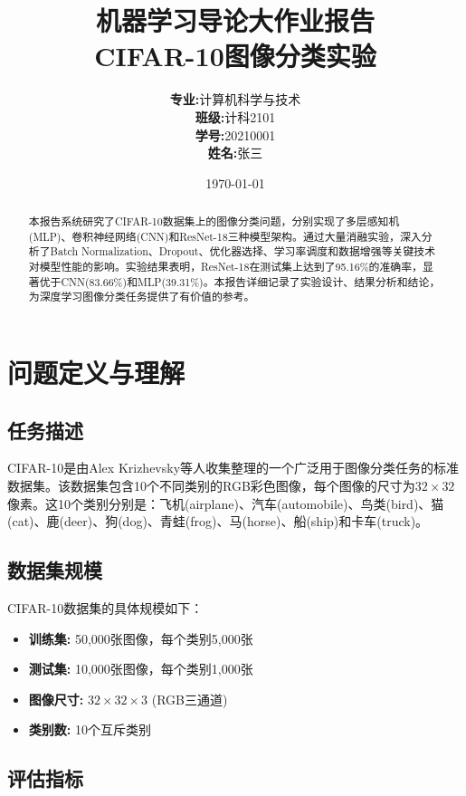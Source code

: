 \documentclass[12pt,a4paper]{article}
\title{\textbf{机器学习导论大作业报告} \\ \vspace{0.5em} \large CIFAR-10图像分类实验}
\author{
    \begin{tabular}{rl}
        \textbf{专业:} & 计算机科学与技术 \\
        \textbf{班级:} & 计科2101 \\
        \textbf{学号:} & 20210001 \\
        \textbf{姓名:} & 张三 \\
    \end{tabular}
}
\date{\today}
\begin{document}
\maketitle

\begin{abstract}
本报告系统研究了CIFAR-10数据集上的图像分类问题，分别实现了多层感知机(MLP)、卷积神经网络(CNN)和ResNet-18三种模型架构。通过大量消融实验，深入分析了Batch Normalization、Dropout、优化器选择、学习率调度和数据增强等关键技术对模型性能的影响。实验结果表明，ResNet-18在测试集上达到了95.16\%的准确率，显著优于CNN(83.66\%)和MLP(39.31\%)。本报告详细记录了实验设计、结果分析和结论，为深度学习图像分类任务提供了有价值的参考。
\end{abstract}

\tableofcontents
\newpage

\section{问题定义与理解}

\subsection{任务描述}

CIFAR-10是由Alex Krizhevsky等人收集整理的一个广泛用于图像分类任务的标准数据集\cite{krizhevsky2009learning}。该数据集包含10个不同类别的RGB彩色图像，每个图像的尺寸为$32 \times 32$像素。这10个类别分别是：飞机(airplane)、汽车(automobile)、鸟类(bird)、猫(cat)、鹿(deer)、狗(dog)、青蛙(frog)、马(horse)、船(ship)和卡车(truck)。

\subsection{数据集规模}

CIFAR-10数据集的具体规模如下：
\begin{itemize}[leftmargin=2em]
    \item \textbf{训练集:} 50,000张图像，每个类别5,000张
    \item \textbf{测试集:} 10,000张图像，每个类别1,000张
    \item \textbf{图像尺寸:} $32 \times 32 \times 3$ (RGB三通道)
    \item \textbf{类别数:} 10个互斥类别
\end{itemize}

\subsection{评估指标}
\end{document}
